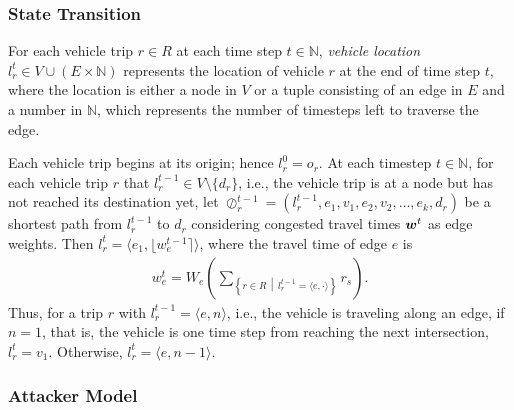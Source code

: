 \subsubsection{State Transition}
\label{sec:state}

For each vehicle trip $r \in R$ at each time step $t \in \mathbb{N}$, \emph{vehicle location} $l_r^t \in V \cup (E \times \mathbb{N})$ represents the location of vehicle $r$ at the end of time step $t$, where the location is either a node in $V$ or a tuple consisting of an edge in $E$ and a number in $\mathbb{N}$, which represents the number of timesteps left to traverse the edge.

Each vehicle trip begins at its origin; hence $l_r^0 = o_r$. At each timestep $t \in \mathbb{N}$, for each vehicle trip $r$ that $l_r^{t-1} \in V \setminus \{ d_r \}$, i.e., the vehicle trip is at a node but has not reached its destination yet, let $\oslash^{t-1}_r = (l_r^{t-1}, e_1, v_1, e_2, v_2, \ldots, e_k, d_r)$ be a shortest path from $l_r^{t-1}$ to $d_r$ considering congested travel times $\boldsymbol{w}^t$ as edge weights.
Then $l_r^t = \langle e_1, \lfloor w_e^{t-1} \rceil \rangle$, where the travel time of edge $e$ is
\begin{align}
    w_e^t = W_e\left(\sum_{\left\{r \in R \, \middle| \, l_r^{t-1} = \langle e, \cdot \rangle \right\}} r_s \right).
\end{align}
Thus, for a trip $r$ with $l_r^{t-1} = \langle e, n \rangle$, i.e., the vehicle is traveling along an edge, if $n = 1$, that is, the vehicle is one time step from reaching the next intersection, $l_r^t = v_1$. Otherwise, $l_r^t = \langle e, n-1 \rangle$. 


\subsubsection{Attacker Model}

